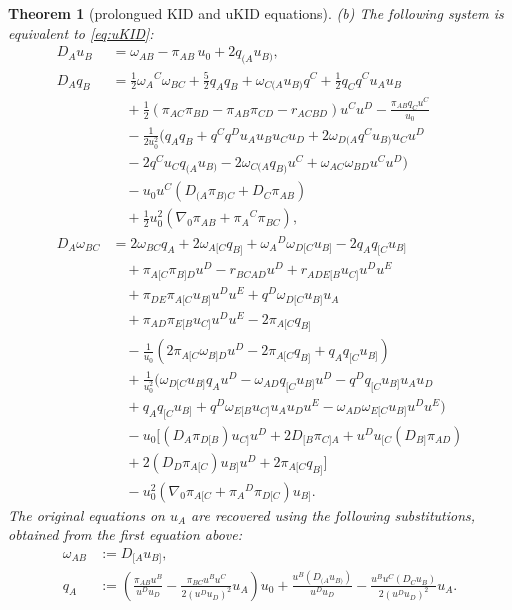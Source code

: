 \documentclass[a4paper]{article}
\newtheorem{thm}{Theorem}
\theoremstyle{remark}
\begin{document}
\begin{thm}[prolongued KID and uKID equations]
(b) The following system is equivalent to \eqref{eq:uKID}:
\begin{equation} \label{eq:canuKID}
\begin{aligned}
	D_A u_B &=
		\omega_{AB} - \pi_{AB}\,u_0 + 2 q_{(A} u_{B)},
\\
	D_A q_B &=
		\frac12 \omega_A{}^{C}\omega_{BC} + \frac52 q_A q_B + \omega_{C(A} u_{B)} q^{C} + \frac12 q_C q^{C} u_A u_B 
\\
& \quad
		+ \frac12 (\pi_{AC} \pi_{BD} - \pi_{AB} \pi_{CD} - r_{ACBD} ) u^{C} u^{D} - \frac{\pi_{AB} q_C u^{C}}{u_0}
\\
& \quad
		- \frac{1}{2 u_0^2} (q_A q_B + q^{C} q^{D} u_A u_B u_C u_D + 2\omega_{D(A} q^{C} u_{B)} u_C u^{D}
\\
& \quad
		- 2q^{C} u_C q_{(A} u_{B)} - 2\omega_{C(A} q_{B)} u^{C} + \omega_{AC} \omega_{BD} u^{C} u^{D} )		
\\
& \quad
		- u_0u^{C} ( D_{(A} \pi_{B)C} + D_C \pi_{AB} )
\\
& \quad
		+ \frac12 u_0^2 (\nabla_0 \pi_{AB} + \pi_A{}^{C} \pi_{BC}),
\\
	D_A \omega_{BC} & = 
		2 \omega_{BC} q_A + 2 \omega_{A[C} q_{B]} + \omega_A{}^D \omega_{D[C} u_{B]} - 2 q_A q_{[C} u_{B]}
\\
& \quad
		 + \pi_{A[C} \pi_{B]D} u^D - r_{BCAD} u^D + r_{ADE[B} u_{C]} u^D u^E
\\
& \quad		
		+ \pi_{DE} \pi_{A[C} u_{B]} u^D u^E + q^D \omega_{D[C} u_{B]} u_A
\\
& \quad
		+ \pi_{AD} \pi_{E[B} u_{C]} u^D u^E - 2 \pi_{A[C} q_{B]}
\\
& \quad
		- \frac{1}{u_0} (2 \pi_{A[C} \omega_{B]D} u^D - 2 \pi_{A[C} q_{B]} + q_A q_{[C} u_{B]})
\\
& \quad
		+ \frac{1}{u_0^2}(\omega_{D[C} u_{B]} q_A u^D - \omega_{AD} q_{[C} u_{B]} u^D - q^D q_{[C} u_{B]} u_A u_D 
\\
& \quad	
		+ q_A q_{[C} u_{B]} + q^D\omega_{E[B} u_{C]} u_A u_D u^E - \omega_{AD} \omega_{E[C} u_{B]} u^D u^E)  
\\
& \quad
		- u_0 [ (D_A \pi_{D[B}) u_{C]} u^D + 2D_{[B} \pi_{C]A} + u^D u_{[C} (D_{B]} \pi_{AD}) 
\\
& \quad
		+ 2 (D_D \pi_{A[C}) u_{B]} u^D + 2 \pi_{A[C} q_{B]}]
\\
& \quad
		- u_0^2 (\nabla_0 \pi_{A[C} + \pi_A{}^D \pi_{D[C}) u_{B]}.
\end{aligned}
\end{equation}
The original equations on $u_A$ are recovered using the following
substitutions, obtained from the first equation above:
\begin{equation} \label{eq:canuKID-defs}
\begin{aligned}
	\omega_{AB} &:= D_{[A}u_{B]}, \\
	q_A &:= \left( \frac{\pi_{AB} u^B}{u^D u_D} - \frac{\pi_{BC} u^B u^C}{2(u^D u_D)^2} u_A \right) u_0 + \frac{u^B(D_{(A} u_{B)})}{u^D u_D} - \frac{u^B u^C (D_C u_B)}{2(u^D u_D)^2} u_A .
\end{aligned}
\end{equation}
\end{thm}
\end{document}
